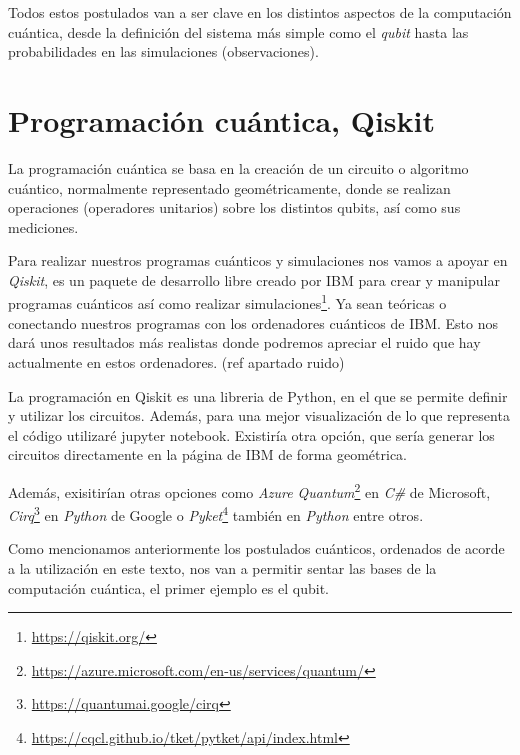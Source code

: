 Todos estos postulados van a ser clave en los distintos aspectos de la computación cuántica, desde la definición del sistema más simple como el \textit{qubit} hasta las probabilidades en las simulaciones (observaciones).

\vspace{15pt}
\section{Programación cuántica, Qiskit}
 La programación cuántica se basa en la creación de un circuito o algoritmo cuántico, normalmente representado geométricamente, donde se realizan operaciones (operadores unitarios) sobre los distintos qubits, así como sus mediciones\cite{B:QuantumScientist:2008}.\newline

 Para realizar nuestros programas cuánticos y simulaciones nos vamos a apoyar en \textit{Qiskit}, es un paquete de desarrollo libre creado por IBM para crear y manipular programas cuánticos así como realizar simulaciones\footnote{\url{https://qiskit.org/}}. Ya sean teóricas o conectando nuestros programas con los ordenadores cuánticos de IBM. Esto nos dará unos resultados más realistas donde podremos apreciar el ruido que hay actualmente en estos ordenadores. (ref apartado ruido) \newline
 
 La programación en Qiskit es una libreria de Python, en el que se permite definir y utilizar los circuitos. Además, para una mejor visualización de lo que representa el código utilizaré jupyter notebook. Existiría otra opción, que sería generar los circuitos directamente en la página de IBM de forma geométrica\footnotemark[1].\newline

 Además, exisitirían otras opciones como \textit{Azure Quantum}\footnote{\url{https://azure.microsoft.com/en-us/services/quantum/}} en \textit{C\#} de Microsoft, \textit{Cirq}\footnote{\url{https://quantumai.google/cirq}} en \textit{Python} de Google o \textit{Pyket}\footnote{\url{https://cqcl.github.io/tket/pytket/api/index.html}} también en \textit{Python} entre otros.
 
 Como mencionamos anteriormente los postulados cuánticos, ordenados de acorde a la utilización en este texto, nos van a permitir sentar las bases de la computación cuántica, el primer ejemplo es el qubit. \newline
 
